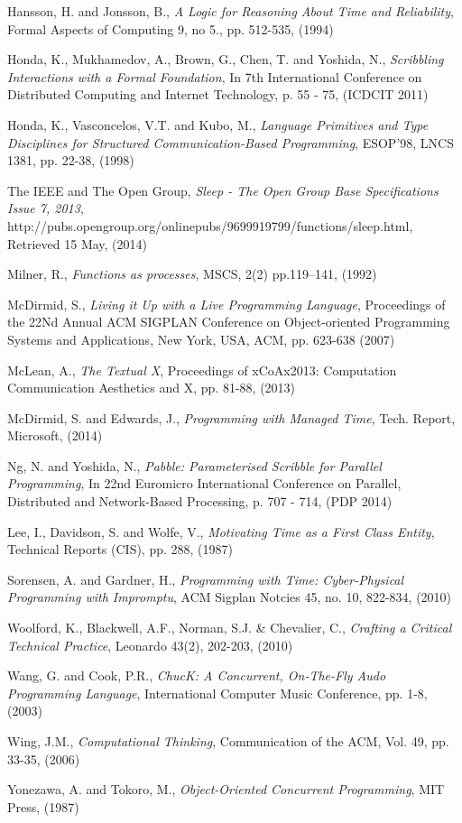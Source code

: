 \documentclass[11pt]{scrartcl}
\begin{document}
\begin{thebibliography}{9}
  Hansson, H. and Jonsson, B.,
  \emph{A Logic for Reasoning About Time and Reliability},
  Formal Aspects of Computing 9,
  no 5., pp. 512-535,
  (1994)

  Honda, K., Mukhamedov, A., Brown, G., Chen, T. and Yoshida, N.,
  \emph{Scribbling Interactions with a Formal Foundation},
  In 7th International Conference on Distributed Computing and Internet Technology,
  p. 55 - 75,
  (ICDCIT 2011)

  Honda, K., Vasconcelos, V.T. and Kubo, M.,
  \emph{Language Primitives and Type Disciplines for Structured Communication-Based Programming},
  ESOP'98, LNCS 1381,
  pp. 22-38,
  (1998)

  The IEEE and The Open Group,
  \emph{Sleep - The Open Group Base Specifications Issue 7, 2013},
  http://pubs.opengroup.org/onlinepubs/9699919799/functions/sleep.html,
  Retrieved 15 May,
  (2014)

   Milner, R.,
   \emph{Functions as processes},
   MSCS, 2(2) pp.119–141,
   (1992)

  McDirmid, S.,
  \emph{Living it Up with a Live Programming Language},
  Proceedings of the 22Nd Annual ACM SIGPLAN Conference on Object-oriented Programming Systems and Applications,
  New York, USA,
  ACM, pp. 623-638
  (2007)

  McLean, A.,
  \emph{The Textual X},
  Proceedings of xCoAx2013: Computation Communication Aesthetics and X,
  pp. 81-88,
  (2013)

  McDirmid, S. and Edwards, J.,
  \emph{Programming with Managed Time},
  Tech. Report, Microsoft,
  (2014)

  Ng, N. and Yoshida, N.,
  \emph{Pabble: Parameterised Scribble for Parallel Programming},
  In 22nd Euromicro International Conference on Parallel, Distributed and Network-Based Processing, 
  p. 707 - 714,
  (PDP 2014)

  Lee, I., Davidson, S. and Wolfe, V.,
  \emph{Motivating Time as a First Class Entity},
  Technical Reports (CIS),
  pp. 288,
  (1987)

  Sorensen, A. and Gardner, H.,
  \emph{Programming with Time: Cyber-Physical Programming with Impromptu},
  ACM Sigplan Notcies 45,
  no. 10, 822-834,
  (2010)

  Woolford, K., Blackwell, A.F., Norman, S.J. \& Chevalier, C.,
  \emph{Crafting a Critical Technical Practice},
  Leonardo 43(2),
  202-203,
  (2010)

  Wang, G. and Cook, P.R.,
  \emph{ChucK: A Concurrent, On-The-Fly Audo Programming Language},
  International Computer Music Conference,
  pp. 1-8,
  (2003)

  Wing, J.M.,
  \emph{Computational Thinking},
  Communication of the ACM,
  Vol. 49, pp. 33-35,
  (2006)

  Yonezawa, A. and Tokoro, M.,
  \emph{Object-Oriented Concurrent Programming},
  MIT Press,
  (1987)

\end{thebibliography}
\end{document}
